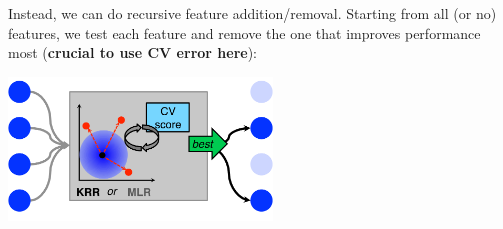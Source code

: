 Instead, we can do recursive feature addition/removal. Starting from all (or no) features, we test each feature and remove the one that improves performance most (\textbf{crucial to use CV error here}):
\pause{}
\begin{center}
	\includegraphics[width=7.0cm]{featureselection/images/wrap}
\end{center}
